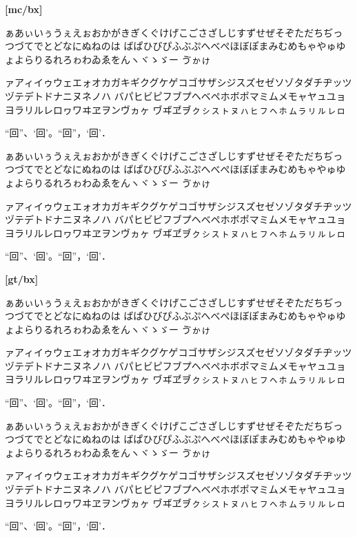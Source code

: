 \documentclass[a4paper,titlepage, draft,dvipdfmx]{\class}
\begin{document}
{\bfseries%
[mc/bx]

ぁあぃいぅうぇえぉおかがきぎくぐけげこごさざしじすずせぜそぞただちぢっつづてでとどなにぬねのは
ばぱひびぴふぶぷへべぺほぼぽまみむめもゃやゅゆょよらりるれろゎわゐゑをんヽヾゝゞー
\ifuptexmode
ゔゕゖ𛄲
\fi

ァアィイゥウェエォオカガキギクグケゲコゴサザシジスズセゼソゾタダチヂッツヅテデトドナニヌネノハ
バパヒビピフブプヘベペホボポマミムメモャヤュユョヨラリルレロヮワヰヱヲンヴヵヶ
\ifuptexmode
ヷヸヹヺㇰㇱㇲㇳㇴㇵㇶㇷㇸㇹㇺㇻㇼㇽㇾㇿ𛅕
\fi

“回”、‘回’。“回”，‘回’．
}

{\gtfamily
[gt/m]

ぁあぃいぅうぇえぉおかがきぎくぐけげこごさざしじすずせぜそぞただちぢっつづてでとどなにぬねのは
ばぱひびぴふぶぷへべぺほぼぽまみむめもゃやゅゆょよらりるれろゎわゐゑをんヽヾゝゞー
\ifuptexmode
ゔゕゖ𛄲
\fi

ァアィイゥウェエォオカガキギクグケゲコゴサザシジスズセゼソゾタダチヂッツヅテデトドナニヌネノハ
バパヒビピフブプヘベペホボポマミムメモャヤュユョヨラリルレロヮワヰヱヲンヴヵヶ
\ifuptexmode
ヷヸヹヺㇰㇱㇲㇳㇴㇵㇶㇷㇸㇹㇺㇻㇼㇽㇾㇿ𛅕
\fi

“回”、‘回’。“回”，‘回’．

{\bfseries%
[gt/bx]

ぁあぃいぅうぇえぉおかがきぎくぐけげこごさざしじすずせぜそぞただちぢっつづてでとどなにぬねのは
ばぱひびぴふぶぷへべぺほぼぽまみむめもゃやゅゆょよらりるれろゎわゐゑをんヽヾゝゞー
\ifuptexmode
ゔゕゖ𛄲
\fi

ァアィイゥウェエォオカガキギクグケゲコゴサザシジスズセゼソゾタダチヂッツヅテデトドナニヌネノハ
バパヒビピフブプヘベペホボポマミムメモャヤュユョヨラリルレロヮワヰヱヲンヴヵヶ
\ifuptexmode
ヷヸヹヺㇰㇱㇲㇳㇴㇵㇶㇷㇸㇹㇺㇻㇼㇽㇾㇿ𛅕
\fi

“回”、‘回’。“回”，‘回’．
}}

{\mgfamily
[mg/m]

ぁあぃいぅうぇえぉおかがきぎくぐけげこごさざしじすずせぜそぞただちぢっつづてでとどなにぬねのは
ばぱひびぴふぶぷへべぺほぼぽまみむめもゃやゅゆょよらりるれろゎわゐゑをんヽヾゝゞー
\ifuptexmode
ゔゕゖ𛄲
\fi

ァアィイゥウェエォオカガキギクグケゲコゴサザシジスズセゼソゾタダチヂッツヅテデトドナニヌネノハ
バパヒビピフブプヘベペホボポマミムメモャヤュユョヨラリルレロヮワヰヱヲンヴヵヶ
\ifuptexmode
ヷヸヹヺㇰㇱㇲㇳㇴㇵㇶㇷㇸㇹㇺㇻㇼㇽㇾㇿ𛅕
\fi

“回”、‘回’。“回”，‘回’．
}
\end{document}
